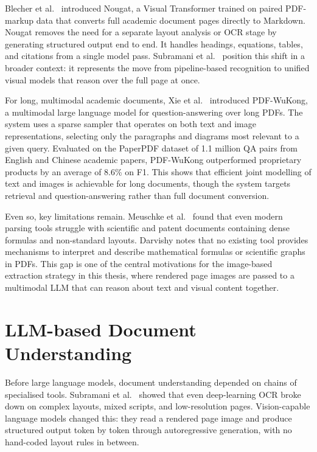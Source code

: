 Blecher et al.\ \autocite{blecher2023} introduced Nougat, a Visual Transformer
trained on paired PDF-markup data that converts full academic document pages
directly to Markdown. Nougat removes the need for a separate layout analysis
or OCR stage by generating structured output end to end. It handles headings,
equations, tables, and citations from a single model pass. Subramani et al.\
\autocite{subramani2020} position this shift in a broader context: it represents
the move from pipeline-based recognition to unified visual models that reason
over the full page at once.

For long, multimodal academic documents, Xie et al.\ \autocite{wukong2024} introduced
PDF-WuKong, a multimodal large language model for question-answering over long
PDFs. The system uses a sparse sampler that operates on both text and image
representations, selecting only the paragraphs and diagrams most relevant to a
given query. Evaluated on the PaperPDF dataset of 1.1 million QA pairs from
English and Chinese academic papers, PDF-WuKong outperformed proprietary products
by an average of 8.6\% on F1. This shows that efficient joint modelling of text
and images is achievable for long documents, though the system targets retrieval
and question-answering rather than full document conversion.

Even so, key limitations remain. Meuschke et al.\ \autocite{meuschke2023} found
that even modern parsing tools struggle with scientific and patent documents
containing dense formulas and non-standard layouts.
Darvishy \autocite{darvishy2018} notes that no existing tool provides mechanisms to
interpret and describe mathematical formulas or scientific graphs in PDFs. This gap
is one of the central motivations for the image-based extraction strategy in this
thesis, where rendered page images are passed to a multimodal LLM that can reason
about text and visual content together.

\section{LLM-based Document Understanding}

Before large language models, document understanding depended on chains of
specialised tools. Subramani et al.\ \autocite{subramani2020} showed that even
deep-learning OCR broke down on complex layouts, mixed scripts, and
low-resolution pages. Vision-capable language models changed this: they read a
rendered page image and produce structured output token by token through
autoregressive generation, with no hand-coded layout rules in between.

